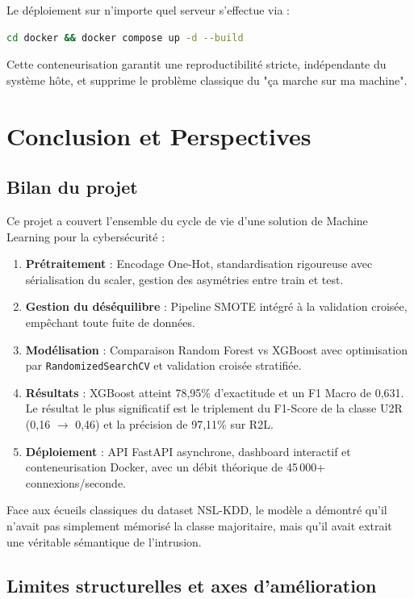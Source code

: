 \documentclass[12pt,a4paper]{report}
\begin{document}
Le déploiement sur n'importe quel serveur s'effectue via :
\begin{lstlisting}[language=bash, numbers=none]
cd docker && docker compose up -d --build
\end{lstlisting}
Cette conteneurisation garantit une reproductibilité stricte, indépendante du système hôte, et supprime le problème classique du "ça marche sur ma machine".


\chapter{Conclusion et Perspectives}

\section{Bilan du projet}

Ce projet a couvert l'ensemble du cycle de vie d'une solution de Machine Learning pour la cybersécurité :
\begin{enumerate}
    \item \textbf{Prétraitement} : Encodage One-Hot, standardisation rigoureuse avec sérialisation du scaler, gestion des asymétries entre train et test.
    \item \textbf{Gestion du déséquilibre} : Pipeline SMOTE intégré à la validation croisée, empêchant toute fuite de données.
    \item \textbf{Modélisation} : Comparaison Random Forest vs XGBoost avec optimisation par \texttt{RandomizedSearchCV} et validation croisée stratifiée.
    \item \textbf{Résultats} : XGBoost atteint 78,95\% d'exactitude et un F1 Macro de 0,631. Le résultat le plus significatif est le triplement du F1-Score de la classe U2R (0,16 $\rightarrow$ 0,46) et la précision de 97,11\% sur R2L.
    \item \textbf{Déploiement} : API FastAPI asynchrone, dashboard interactif et conteneurisation Docker, avec un débit théorique de 45\,000+ connexions/seconde.
\end{enumerate}

Face aux écueils classiques du dataset NSL-KDD, le modèle a démontré qu'il n'avait pas simplement mémorisé la classe majoritaire, mais qu'il avait extrait une véritable sémantique de l'intrusion.

\section{Limites structurelles et axes d'amélioration}
\end{document}
